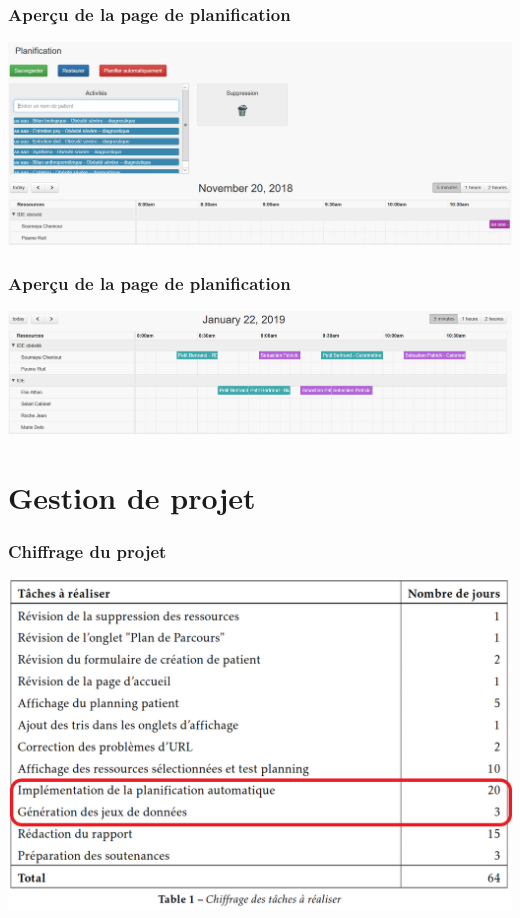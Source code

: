 \documentclass{beamer}
\begin{document}
\begin{frame}
\frametitle{Aperçu de la page de planification}

\begin{center}
	\includegraphics[scale=0.3]{images/bouton_plan_auto}
\end{center}

\end{frame}

\begin{frame}
\frametitle{Aperçu de la page de planification}

\begin{center}
	\includegraphics[scale=0.175]{images/exemple_calendrier}
\end{center}

\end{frame}


\section[Gestion de projet]{Gestion de projet}

\begin{frame}
\frametitle{Chiffrage du projet}

\begin{center}
	\includegraphics[scale=0.375]{images/chiffrage}
\end{center}

\end{frame}
\end{document}
